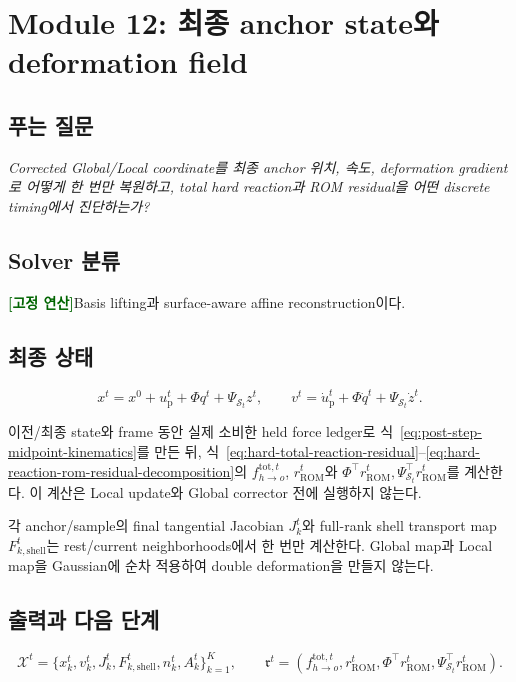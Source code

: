 \documentclass[11pt,a4paper]{article}
\newcommand{\deterministic}{\textcolor{darkgreen}{\textbf{[고정 연산]}}}
\begin{document}
\section{Module 12: 최종 anchor state와 deformation field}

\subsection*{푸는 질문}

\emph{Corrected Global/Local coordinate를 최종 anchor 위치, 속도,
deformation gradient로 어떻게 한 번만 복원하고, total hard reaction과 ROM residual을
어떤 discrete timing에서 진단하는가?}

\subsection*{Solver 분류}

\deterministic Basis lifting과 surface-aware affine reconstruction이다.

\subsection*{최종 상태}

\begin{equation}
  x^t=x^0+u_{\mathrm p}^t+\Phi q^t+\Psi_{\mathcal S_t}z^t,
  \qquad
  v^t=\dot u_{\mathrm p}^t+\Phi\dot q^t+\Psi_{\mathcal S_t}\dot z^t.
\end{equation}

이전/최종 state와 frame 동안 실제 소비한 held force ledger로
식~\eqref{eq:post-step-midpoint-kinematics}를 만든 뒤,
식~\eqref{eq:hard-total-reaction-residual}--\eqref{eq:hard-reaction-rom-residual-decomposition}의
\(f_{h\rightarrow o}^{\mathrm{tot},t}\), \(r_{\mathrm{ROM}}^t\)와
\(\Phi^\top r_{\mathrm{ROM}}^t,\Psi_{\mathcal S_t}^\top r_{\mathrm{ROM}}^t\)를 계산한다.
이 계산은 Local update와 Global corrector 전에 실행하지 않는다.

각 anchor/sample의 final tangential Jacobian \(J_k^t\)와
full-rank shell transport map \(F_{k,\mathrm{shell}}^t\)는
rest/current neighborhoods에서 한 번만 계산한다.
Global map과 Local map을 Gaussian에 순차 적용하여 double deformation을 만들지 않는다.

\subsection*{출력과 다음 단계}

\begin{equation}
  \mathcal X^t
  =
  \{x_k^t,v_k^t,J_k^t,F_{k,\mathrm{shell}}^t,n_k^t,A_k^t\}_{k=1}^K,
  \qquad
  \mathfrak r^t
  =
  (f_{h\rightarrow o}^{\mathrm{tot},t},r_{\mathrm{ROM}}^t,
   \Phi^\top r_{\mathrm{ROM}}^t,\Psi_{\mathcal S_t}^\top r_{\mathrm{ROM}}^t).
\end{equation}
\end{document}
